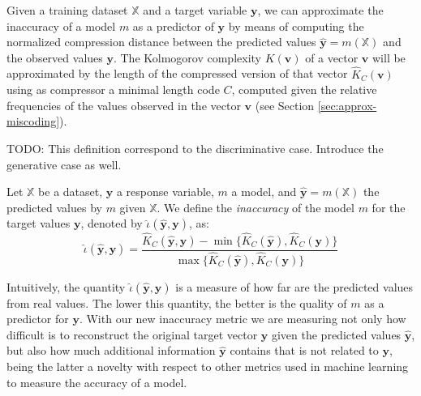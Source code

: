 Given a training dataset $\mathbb{X}$ and a target variable $\mathbf{y}$, we can approximate the inaccuracy of a model $m$ as a predictor of $\mathbf{y}$ by means of computing the normalized compression distance between the predicted values $\mathbf{\hat{y}} = m(\mathbb{X})$ and the observed values $\mathbf{y}$. The Kolmogorov complexity $K(\mathbf{v})$ of a vector $\mathbf{v}$ will be approximated by the length of the compressed version of that vector $\hat{K}_C(\mathbf{v})$ using as compressor a minimal length code $C$, computed given the relative frequencies of the values observed in the vector $\mathbf{v}$ (see Section \ref{sec:approx-miscoding}).

{\color{red} TODO: This definition correspond to the discriminative case. Introduce the generative case as well.}

\begin{definition}
Let $\mathbb{X}$ be a dataset, $\mathbf{y}$ a response variable, $m$ a model, and $\mathbf{\hat{y}} = m(\mathbb{X})$ the predicted values by $m$ given $\mathbb{X}$. We define the \emph{inaccuracy} of the model $m$ for the target values $\mathbf{y}$, denoted by $\hat\iota(\mathbf{\hat{y}}, \mathbf{y})$, as:
\[
\hat\iota(\mathbf{\hat{y}}, \mathbf{y}) = \frac{ \hat{K}_C(\mathbf{\hat{y}}, \mathbf{y}) - \min\{ \hat{K}_C(\mathbf{\hat{y}}), \hat{K}_C(\mathbf{y}) \} } { \max\{ \hat{K}_C(\mathbf{\hat{y}}), \hat{K}_C(\mathbf{y}) \} }
\]\end{definition}

Intuitively, the quantity $\hat\iota(\mathbf{\hat{y}}, \mathbf{y})$ is a measure of how far are the predicted values from real values. The lower this quantity, the better is the quality of $m$ as a predictor for $\mathbf{y}$. With our new inaccuracy metric we are measuring not only how difficult is to reconstruct the original target vector $\mathbf{y}$ given the predicted values $\mathbf{\hat{y}}$, but also how much additional information $\mathbf{\hat{y}}$ contains that is not related to $\mathbf{y}$, being the latter a novelty with respect to other metrics used in machine learning to measure the accuracy of a model.

